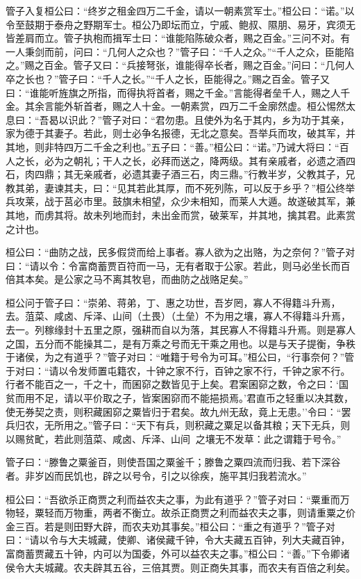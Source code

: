 \documentclass[]{article}
\begin{document}
管子入复桓公曰：``终岁之租金四万二千金，请以一朝素赏军士。''桓公曰：``诺。''以令至鼓期于泰舟之野期军士。桓公乃即坛而立，宁戚、鲍叔、隰朋、易牙，宾须无皆差肩而立。管子执枹而揖军士曰：``谁能陷陈破众者，赐之百金。''三问不对。有一人秉剑而前，问曰：``几何人之众也？''管子曰：``千人之众。''``千人之众，臣能陷之。''赐之百金。管子又曰：``兵接弩张，谁能得卒长者，赐之百金。''问曰：``几何人卒之长也？''管子曰：``千人之长。''``千人之长，臣能得之。''赐之百金。管子又曰：``谁能听旌旗之所指，而得执将首者，赐之千金。''言能得者垒千人，赐之人千金。其余言能外斩首者，赐之人十金。一朝素赏，四万二千金廓然虚。桓公惕然太息曰：``吾曷以识此？''管子对曰：``君勿患。且使外为名于其内，乡为功于其亲，家为德于其妻子。若此，则士必争名报德，无北之意矣。吾举兵而攻，破其军，并其地，则非特四万二千金之利也。''五子曰：``善。''桓公曰：``诺。''乃诫大将曰：``百人之长，必为之朝礼；干人之长，必拜而送之，降两级。其有亲戚者，必遗之酒四石，肉四鼎；其无亲戚者，必遗其妻子酒三石，肉三鼎。''行教半岁，父教其子，兄教其弟，妻谏其夫，曰：``见其若此其厚，而不死列陈，可以反于乡乎？''桓公终举兵攻莱，战于莒必市里。鼓旗未相望，众少未相知，而莱人大遁。故遂破其军，兼其地，而虏其将。故未列地而封，未出金而赏，破莱军，并其地，擒其君。此素赏之计也。

桓公曰：``曲防之战，民多假贷而给上事者。寡人欲为之出赂，为之奈何？''管子对曰：``请以令：令富商蓄贾百符而一马，无有者取于公家。若此，则马必坐长而百倍其本矣。是公家之马不离其牧皂，而曲防之战赂足矣。''

桓公问于管子曰：``崇弟、蒋弟，丁、惠之功世，吾岁罔，寡人不得籍斗升焉，去。菹菜、咸卤、斥泽、山间（土畏）（土垒）不为用之壤，寡人不得籍斗升焉，去一。列稼缘封十五里之原，强耕而自以为落，其民寡人不得籍斗升焉。则是寡人之国，五分而不能操其二，是有万乘之号而无干乘之用也。以是与天子提衡，争秩于诸侯，为之有道乎？''管子对曰：``唯籍于号令为可耳。''桓公曰，``行事奈何？''管于对曰：``请以令发师置屯籍农，十钟之家不行，百钟之家不行，千钟之家不行。行者不能百之一，千之十，而囷窌之数皆见于上矣。君案囷窌之数，令之曰：`国贫而用不足，请以平价取之子，皆案囷窌而不能挹损焉。'君直币之轻重以决其数，使无券契之责，则积藏囷窌之粟皆归于君矣。故九州无敌，竟上无患。''令曰：``罢兵归农，无所用之。''管子曰：``天下有兵，则积藏之粟足以备其粮；天下无兵，则以赐贫甿，若此则菹菜、咸卤、斥泽、山间之壤无不发草：此之谓籍于号令。''

管子曰：``滕鲁之粟釜百，则使吾国之粟釜千；滕鲁之粟四流而归我、若下深谷者。非岁凶而民饥也，辟之以号令，引之以徐疾，施平其归我若流水。''

桓公曰：``吾欲杀正商贾之利而益农夫之事，为此有道乎？''管子对曰：``粟重而万物轻，粟轻而万物重，两者不衡立。故杀正商贾之利而益农夫之事，则请重粟之价金三百。若是则田野大辟，而农夫劝其事矣。''桓公曰：``重之有道乎？''管子对曰：``请以令与大夫城藏，使卿、诸侯藏千钟，令大夫藏五百钟，列大夫藏百钟，富商蓄贾藏五十钟，内可以为国委，外可以益农夫之事。''桓公曰：``善。''下令卿诸侯令大夫城藏。农夫辟其五谷，三倍其贾。则正商失其事，而农夫有百倍之利矣。
\end{document}
